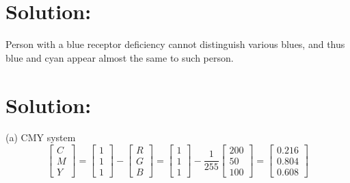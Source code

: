 \documentclass[12pt]{article}
\begin{document}
\section{Solution:}
Person with a blue receptor deficiency cannot distinguish various blues, and thus blue and cyan appear almost the same to such person.
\section{Solution:}
(a) CMY system\\
\begin{equation*}
{\left[ \begin{array}{c}
C\\
M\\
Y
\end{array} 
\right]} = {\left[ \begin{array}{c}
1\\
1\\
1
\end{array} 
\right]} - 
{\left[ \begin{array}{c}
R\\
G\\
B
\end{array} 
\right]} = 
{\left[ \begin{array}{c}
1\\
1\\
1
\end{array} 
\right]} - \frac{1}{255}
{\left[ \begin{array}{c}
200\\
50\\
100
\end{array} 
\right]} 
={\left[ \begin{array}{c}
0.216\\
0.804\\
0.608
\end{array} 
\right]}
\end{equation*}
\end{document}
